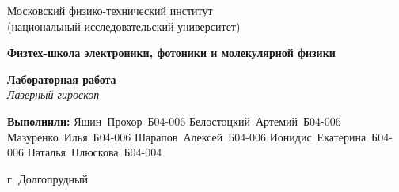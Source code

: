 \documentclass[a4paper, 12pt]{article}
\begin{document}
\begin{titlepage}
  \begin{center}
    \large
    Московский физико-технический институт \\ (национальный исследовательский университет)
     
    \vspace{0.75cm}
     
    \textbf{Физтех-школа электроники, фотоники и молекулярной физики}
     
    \vfill
    
    \Large
    \textbf{Лабораторная работа} \\
    \textit{Лазерный гироскоп} \\
     
    \vfill
\end{center}

\vbox{
\hfill
\vbox{
\hbox{\textbf{Выполнили:}}
\hbox{Яшин Прохор Б04-006}
\hbox{Белостоцкий Артемий Б04-006}
\hbox{Мазуренко Илья Б04-006}
\hbox{Шарапов Алексей Б04-006}
\hbox{Ионидис Екатерина Б04-006}
\hbox{Наталья Плюскова Б04-004}
%
}%
} 


\vfill
 
\begin{center}
    г. Долгопрудный \\
\end{center}
\end{titlepage}

\newpage

\newpage









\newpage


\end{document}
